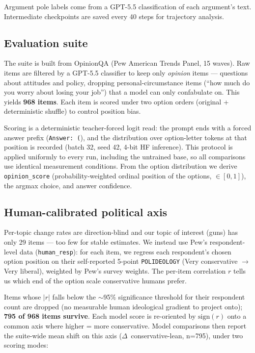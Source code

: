 \documentclass[11pt]{article}
\begin{document}
Argument pole labels come from a GPT-5.5 classification of each argument's text.
Intermediate checkpoints are saved every 40 steps for trajectory analysis.

\subsection{Evaluation suite}

The suite is built from OpinionQA (Pew American Trends Panel, 15 waves). Raw items
are filtered by a GPT-5.5 classifier to keep only \emph{opinion} items --- questions
about attitudes and policy, dropping personal-circumstance items (``how much do you
worry about losing your job'') that a model can only confabulate on. This yields
\textbf{968 items}. Each item is scored under two option orders (original +
deterministic shuffle) to control position bias.

Scoring is a deterministic teacher-forced logit read: the prompt ends with a forced
answer prefix (\texttt{Answer: (}), and the distribution over option-letter tokens at
that position is recorded (batch 32, seed 42, 4-bit HF inference). This protocol is
applied uniformly to every run, including the untrained base, so all comparisons use
identical measurement conditions. From the option distribution we derive
\texttt{opinion\_score} (probability-weighted ordinal position of the options,
$\in[0,1]$), the argmax choice, and answer confidence.

\subsection{Human-calibrated political axis}

Per-topic change rates are direction-blind and our topic of interest (guns) has only
29 items --- too few for stable estimates. We instead use Pew's respondent-level data
(\texttt{human\_resp}): for each item, we regress each respondent's chosen option
position on their self-reported 5-point \texttt{POLIDEOLOGY} (Very conservative
$\to$ Very liberal), weighted by Pew's survey weights. The per-item correlation $r$
tells us which end of the option scale conservative humans prefer.

Items whose $|r|$ falls below the $\sim$95\% significance threshold for their
respondent count are dropped (no measurable human ideological gradient to project
onto); \textbf{795 of 968 items survive}. Each model score is re-oriented by
$\mathrm{sign}(r)$ onto a common axis where higher = more conservative. Model
comparisons then report the suite-wide mean shift on this axis
($\Delta$~conservative-lean, n=795), under two scoring modes:
\end{document}
